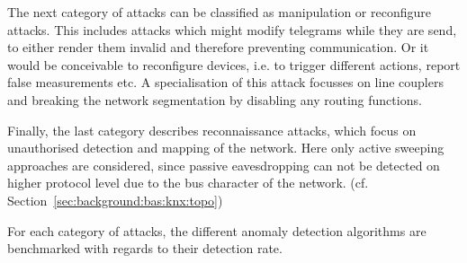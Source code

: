 The next category of attacks can be classified as manipulation or reconfigure attacks. This includes attacks which might modify telegrams while they are send, to either render them invalid and therefore preventing communication. Or it would be conceivable to reconfigure devices, i.e. to trigger different actions, report false measurements etc. A specialisation of this attack focusses on line couplers and breaking the network segmentation by disabling any routing functions.

Finally, the last category describes reconnaissance attacks, which focus on unauthorised detection and mapping of the network. Here only active sweeping approaches are considered, since passive eavesdropping can not be detected on higher protocol level due to the bus character of the network. (cf. Section~\ref{sec:background:bas:knx:topo})

For each category of attacks, the different anomaly detection algorithms are benchmarked with regards to their detection rate.





\begin{comment}
Angriffe:

DoS
	Kurzschluss im Bus -> DoS auf gesamtem Segment
	A_Restart-Pakete -> DoS gegen einzelne Teilnehmer
Replay-Angriffe
	Zeit mitschneiden -> wiedergeben
	Tag mitschneiden, komprimiert wiedergeben
Manipulation von Paketen (Payload tauschen)
Konfiguration manipulieren
Überwindung von Linienkopplern
Address-Spoofing
	falsche Adresse in Liniensegment
	mit existierender Adresse senden
Netzanalyse mit knxMap (https://github.com/takeshixx/knxmap)
Mitlesen und sofort gegenteilige Aktion auslösen
High-Level-Angriffe:
	nur best. Aktionen zulassen
	Provokation/Sabotage von menschl. Verhalten
Social-Engineering -> Einschleusen von Geräten
\end{comment}